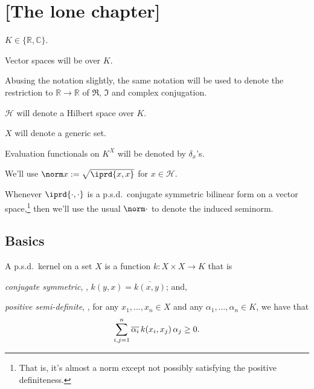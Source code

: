 \chapter{[The lone chapter]}

\begin{conv}
	\leavevmode
	\begin{assmplist}
		\item $K\in\{\mathbb R, \mathbb C\}$.
		
		\item Vector spaces will be over $K$.
		
		\item Abusing the notation slightly, the same notation will be used to denote the restriction to $\mathbb{R\to R}$ of $\Re$, $\Im$ and complex conjugation.
		
		\item $\mathscr H$ will denote a Hilbert space over $K$.
		
		\item $X$ will denote a generic set.
		
		\item Evaluation functionals on $K^X$ will be denoted by $\delta_x$'s.
		
		\item We'll use $\norm x := \sqrt{\iprd{x, x}}$ for $x\in\mathscr H$.
		
		\item Whenever $\iprd{\cdot, \cdot}$ is a p.s.d.\ conjugate symmetric bilinear form on a vector space,\footnote{
			That is, it's almost a norm except not possibly satisfying the positive definiteness.
		} then we'll use the usual $\norm\cdot$ to denote the induced seminorm.
	\end{assmplist}
\end{conv}

\section{Basics}

	\begin{dfn}
		A p.s.d.\ kernel on a set $X$ is a function $k\colon X\times X\to K$ that is
		\begin{mylist}
			\item \emph{conjugate symmetric}, \ie, $k(y, x) = \overline{k(x, y)}$; and,
			
			\item \emph{positive semi-definite}, \ie, for any $x_1, \ldots, x_n\in X$ and any $\alpha_1, \ldots, \alpha_n\in K$, we have that
			\[
			\sum_{i, j = 1}^n \overline{\alpha_i}\, k(x_i, x_j)\, \alpha_j\ge 0\text.
			\]
		\end{mylist}
	\end{dfn}
	
